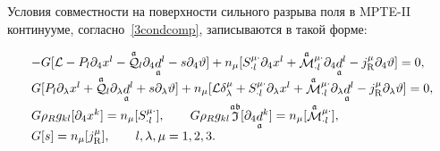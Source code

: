 Условия совместности на поверхности сильного разрыва поля в MPTE-II континууме, согласно~\eqref{3condcomp}, записываются в такой форме:

\begin{equation}

\begin{array}{l}

-G [

{\mathcal L}-P_l\partial_4 x^l-

{\mathop {\mathcal Q}\limits^{\mathfrak a}}{}_l\partial_4{\mathop d\limits_{\mathfrak a}}^l

-s\partial_4\vartheta

] +

{ n_\mu}

[

 S_{\cdot l}^{\mu\cdot}\partial_4 x^l+{\mathop {\mathcal M}\limits^{\mathfrak a}}{}_{\cdot l}^{\mu\cdot}\partial_4{\mathop d\limits_{\mathfrak a}}^l-

j^\mu_{\rm R}\partial_4\vartheta

]  =  0,\\

G[

 P_l\partial_\lambda x^l+

{\mathop {\mathcal Q}\limits^{\mathfrak a}}{}_l\partial_\lambda{\mathop d\limits_{\mathfrak a}}^l+s\partial_\lambda\vartheta

 ] + { n_\mu}[

  {\mathcal L}\delta_\lambda^\mu+S_{\cdot l}^{\mu\cdot}\partial_\lambda x^l+{\mathop {\mathcal M}\limits^{\mathfrak a}}{}_{\cdot l}^{\mu\cdot}\partial_\lambda{\mathop d\limits_{\mathfrak a}}^l-j^\mu_{\rm R}\partial_\lambda\vartheta

  ] =0,\\

 G \rho_Rg_{kl}[ \partial_4 x^k] ={ n_\mu}[ S_{\cdot l}^{\mu\cdot}], \qquad

G \rho_Rg_{kl}{\mathop {\mathfrak I}\limits^{\mathfrak a\mathfrak b}}[ \partial_4  {\mathop d\limits_{\mathfrak a}}^k] ={ n_\mu}[ {\mathop {\mathcal M}\limits^{\mathfrak a}}{}_{\cdot l}^{\mu\cdot}],\\

G [s]={ n_\mu}[ j^\mu_{\rm R}], \qquad l, \lambda, \mu= 1, 2, 3. \\

\end{array}

\end{equation}



